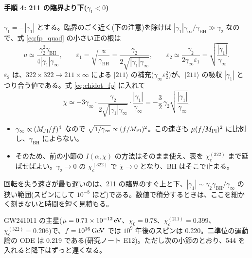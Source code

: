 \paragraph{手順 4: 211 の臨界より下($\gamma_1<0$)}
$\gamma_1=-|\gamma_1|$ とする。臨界のごく近く(下の注意)を除けば $|\gamma_1|\gamma_\infty/\gamma_\mathrm{BH}\gg\gamma_2$ なので、式 \eqref{eq:fp_quad} の小さい正の根は
\begin{equation}
u\simeq\frac{\gamma_2^2\gamma_\mathrm{BH}}{4|\gamma_1|\gamma_\infty},\qquad
\varepsilon_1=\sqrt{\frac{u}{\gamma_\mathrm{BH}}}=\frac{\gamma_2}{2\sqrt{|\gamma_1|\gamma_\infty}},\qquad
\varepsilon_2\simeq\frac{\gamma_2}{2\gamma_\infty\varepsilon_1}=\sqrt{\frac{|\gamma_1|}{\gamma_\infty}} .
\end{equation}
$\varepsilon_2$ は、$322\times322\to211\times\infty$ による $|211\rangle$ の補充($\gamma_\infty\varepsilon_2^2$)が、$|211\rangle$ の吸収 $|\gamma_1|$ とつり合う値である。式 \eqref{eq:chidot_fp} に入れて
\begin{equation}
\dot\chi\simeq-3\gamma_\infty\cdot\frac{\gamma_2}{2\sqrt{|\gamma_1|\gamma_\infty}}\cdot\frac{|\gamma_1|}{\gamma_\infty}=-\frac32\,\gamma_2\sqrt{\frac{|\gamma_1|}{\gamma_\infty}} .
\end{equation}
\begin{itemize}
\item $\gamma_\infty\propto(M_\mathrm{Pl}/f)^4$ なので $\sqrt{1/\gamma_\infty}\propto(f/M_\mathrm{Pl})^2$。この速さも $\mu(f/M_\mathrm{Pl})^2$ に比例し、$\gamma_\mathrm{BH}$ によらない。
\item そのため、前の小節の $I(\alpha,\chi)$ の方法はそのまま使え、表を $\chi_c^{(322)}$ まで延ばせばよい。$\gamma_2\to0$ の $\chi_c^{(322)}$ で $\dot\chi\to0$ となり、BH はそこで止まる。
\end{itemize}

\begin{caution}
回転を失う速さが最も遅いのは、211 の臨界のすぐ上と下、$|\gamma_1|\sim\gamma_2\gamma_\mathrm{BH}/\gamma_\infty$ の狭い範囲(スピンにして $10^{-8}$ ほど)である。数値で積分するときは、ここを細かく刻まないと時間を短く見積もる。
\end{caution}

\begin{numcheck}
GW241011 の主星($\mu=0.71\times10^{-12}\,\mathrm{eV}$、$\chi_0=0.78$、$\chi_c^{(211)}=0.399$、$\chi_c^{(322)}=0.206$)で、$f=10^{16}\,\mathrm{GeV}$ では $10^9$ 年後のスピンは 0.220。二準位の運動論の ODE は 0.219 である(研究ノート E12)。ただし次の小節のとおり、544 を入れると降下はずっと遅くなる。
\end{numcheck}

